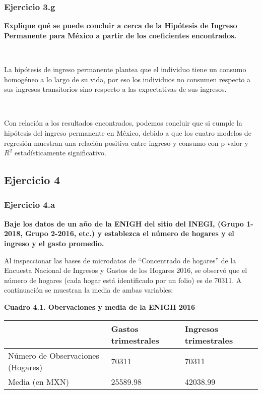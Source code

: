 \documentclass[
]{article}
\begin{document}
\hypertarget{ejercicio-3.g}{%
\subsubsection{Ejercicio 3.g}\label{ejercicio-3.g}}

\textbf{Explique qué se puede concluir a cerca de la Hipótesis de
Ingreso Permanente para México a partir de los coeficientes
encontrados.}

~

La hipótesis de ingreso permanente plantea que el individuo tiene un
consumo homogéneo a lo largo de su vida, por eso los individuos no
consumen respecto a sus ingresos transitorios sino respecto a las
expectativas de sus ingresos.

~

Con relación a los resultados encontrados, podemos concluir que si
cumple la hipótesis del ingreso permanente en México, debido a que los
cuatro modelos de regresión muestran una relación positiva entre ingreso
y consumo con p-valor y \(R^2\) estadísticamente significativo.

\newpage

\hypertarget{ejercicio-4}{%
\subsection{Ejercicio 4}\label{ejercicio-4}}

\hypertarget{ejercicio-4.a}{%
\subsubsection{Ejercicio 4.a}\label{ejercicio-4.a}}

\textbf{Baje los datos de un año de la ENIGH del sitio del INEGI, (Grupo
1-2018, Grupo 2-2016, etc.) y establezca el número de hogares y el
ingreso y el gasto promedio.}

Al inspeccionar las bases de microdatos de ``Concentrado de hogares'' de
la Encuesta Nacional de Ingresos y Gastos de los Hogares 2016, se
observó que el número de hogares (cada hogar está identificado por un
folio) es de 70311. A continuación se muestran la media de ambas
variables:

\begin{center}
\textbf{Cuadro 4.1. Obervaciones y media de la ENIGH 2016}
\end{center}

\begin{longtable}[]{@{}lll@{}}
\toprule
& Gastos trimestrales & Ingresos trimestrales \\
\midrule
\endhead
Número de Observaciones (Hogares) & 70311 & 70311 \\
Media (en MXN) & 25589.98 & 42038.99 \\
\bottomrule
\end{longtable}
\end{document}
